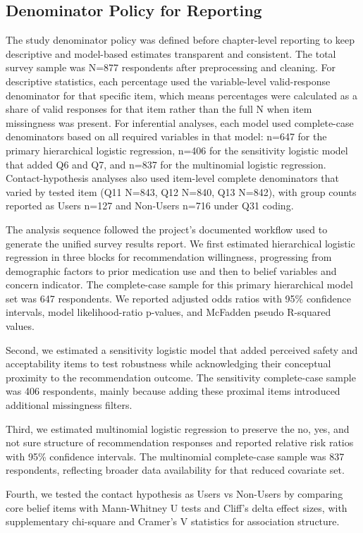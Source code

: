 \documentclass[12pt,a4paper]{article}
\begin{document}
\subsection*{Denominator Policy for Reporting}
The study denominator policy was defined before chapter-level reporting to keep descriptive and model-based estimates transparent and consistent. The total survey sample was N=877 respondents after preprocessing and cleaning. For descriptive statistics, each percentage used the variable-level valid-response denominator for that specific item, which means percentages were calculated as a share of valid responses for that item rather than the full N when item missingness was present. For inferential analyses, each model used complete-case denominators based on all required variables in that model: n=647 for the primary hierarchical logistic regression, n=406 for the sensitivity logistic model that added Q6 and Q7, and n=837 for the multinomial logistic regression. Contact-hypothesis analyses also used item-level complete denominators that varied by tested item (Q11 N=843, Q12 N=840, Q13 N=842), with group counts reported as Users n=127 and Non-Users n=716 under Q31 coding.

The analysis sequence followed the project’s documented workflow used to generate the unified survey results report. We first estimated hierarchical logistic regression in three blocks for recommendation willingness, progressing from demographic factors to prior medication use and then to belief variables and concern indicator. The complete-case sample for this primary hierarchical model set was 647 respondents. We reported adjusted odds ratios with 95\% confidence intervals, model likelihood-ratio p-values, and McFadden pseudo R-squared values.

Second, we estimated a sensitivity logistic model that added perceived safety and acceptability items to test robustness while acknowledging their conceptual proximity to the recommendation outcome. The sensitivity complete-case sample was 406 respondents, mainly because adding these proximal items introduced additional missingness filters.

Third, we estimated multinomial logistic regression to preserve the no, yes, and not sure structure of recommendation responses and reported relative risk ratios with 95\% confidence intervals. The multinomial complete-case sample was 837 respondents, reflecting broader data availability for that reduced covariate set.

Fourth, we tested the contact hypothesis as Users vs Non-Users by comparing core belief items with Mann-Whitney U tests and Cliff’s delta effect sizes, with supplementary chi-square and Cramer’s V statistics for association structure.
\end{document}
